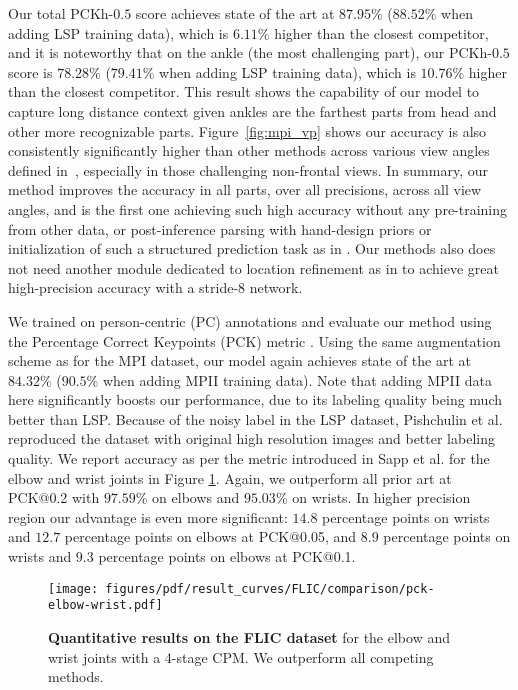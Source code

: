 \documentclass[10pt,twocolumn,letterpaper]{article}
\begin{document}
Our total PCKh-$0.5$ score achieves state of the art at $87.95\%$ ($88.52\%$ when adding LSP training data), which is $6.11\%$ higher than the closest competitor, and it is noteworthy that on the ankle (the most challenging part), our PCKh-$0.5$ score is $78.28\%$ ($79.41\%$ when adding LSP training data), which is $10.76\%$ higher than the closest competitor. This result shows the capability of our model to capture long distance context given ankles are the farthest parts from head and other more recognizable parts. Figure~\ref{fig:mpi_vp} shows our accuracy is also consistently significantly higher than other methods across various view angles defined in~\cite{andriluka14cvpr}, especially in those challenging non-frontal views.
In summary, our method improves the accuracy in all parts, over all precisions, across all view angles, and is the first one achieving such high accuracy without any pre-training from other data, or post-inference parsing with hand-design priors or initialization of such a structured prediction task as in \cite{tompson2014joint,pishchulin2015deepcut}. Our methods also does not need another module dedicated to location refinement as in \cite{tompson2015cvpr} to achieve great high-precision accuracy with a stride-8 network.

We trained on person-centric (PC) annotations and evaluate our method using the Percentage Correct Keypoints (PCK) metric \cite{yang2013articulated}.
Using the same augmentation scheme as for the MPI dataset, our model again achieves state of the art at $84.32\%$ ($90.5\%$ when adding MPII training data). Note that adding MPII data here significantly boosts our performance, due to its labeling quality being much better than LSP. Because of the noisy label in the LSP dataset, Pishchulin et al. \cite{pishchulin2015deepcut} reproduced the dataset with original high resolution images and better labeling quality.
We report accuracy as per the metric introduced in Sapp et al. \cite{sappmodec} for the elbow and wrist joints in Figure \ref{fig:flic_quant}. Again, we outperform all prior art at PCK@0.2 with $97.59\%$ on elbows and $95.03\%$ on wrists. In higher precision region our advantage is even more significant: $14.8$ percentage points on wrists and $12.7$ percentage points on elbows at PCK@0.05, and $8.9$ percentage points on wrists and $9.3$ percentage points on elbows at PCK@0.1.

\begin{figure}[ht!]
    \centering
    \texttt{[image: figures/pdf/result\_curves/FLIC/comparison/pck-elbow-wrist.pdf]}
    \vspace{-20pt}
    \caption{\textbf{Quantitative results on the FLIC dataset} for the elbow and wrist joints with a 4-stage  CPM. We outperform all competing methods.}
    \label{fig:flic_quant}
\end{figure}
\end{document}
